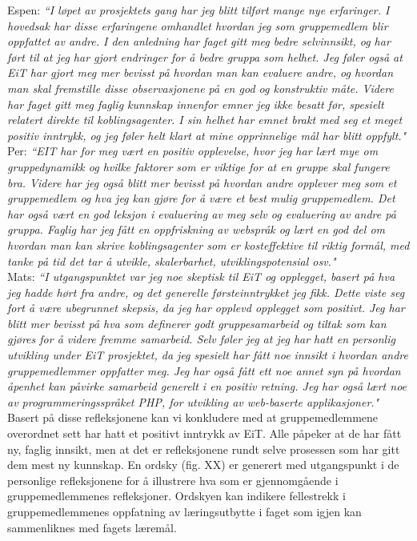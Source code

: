 Espen: \textit{``I løpet av prosjektets gang har jeg blitt tilført mange nye erfaringer. I hovedsak har disse erfaringene omhandlet hvordan jeg som gruppemedlem blir oppfattet av andre. I den anledning har faget gitt meg bedre selvinnsikt, og har ført til at jeg har gjort endringer for å bedre gruppa som helhet. Jeg føler også at EiT har gjort meg mer bevisst på hvordan man kan evaluere andre, og hvordan man skal fremstille disse observasjonene på en god og konstruktiv måte. Videre har faget gitt meg faglig kunnskap innenfor emner jeg ikke besatt før, spesielt relatert direkte til koblingsagenter. I sin helhet har emnet brakt med seg et meget positiv inntrykk, og jeg føler helt klart at mine opprinnelige mål har blitt oppfylt."}\\

Per: \textit{``EIT har for meg vært en positiv opplevelse, hvor jeg har lært mye om gruppedynamikk og hvilke faktorer som er viktige for at en gruppe skal fungere bra. Videre har jeg også blitt mer bevisst på hvordan andre opplever meg som et gruppemedlem og hva jeg kan gjøre for å være et best mulig gruppemedlem. Det har også vært en god leksjon i evaluering av meg selv og evaluering av andre på gruppa. Faglig har jeg fått en oppfriskning av webspråk og lært en god del om hvordan man kan skrive koblingsagenter som er kosteffektive til riktig formål, med tanke på tid det tar å utvikle, skalerbarhet, utviklingspotensial osv."}\\

Mats: \textit{``I utgangspunktet var jeg noe skeptisk til EiT og opplegget, basert på hva jeg hadde hørt fra andre, og det generelle førsteinntrykket jeg fikk. Dette viste seg fort å være ubegrunnet skepsis, da jeg har opplevd opplegget som positivt. Jeg har blitt mer bevisst på hva som definerer godt gruppesamarbeid og tiltak som kan gjøres for å videre fremme samarbeid.  Selv føler jeg at jeg har hatt en personlig utvikling under EiT prosjektet, da jeg spesielt har fått noe innsikt i hvordan andre gruppemedlemmer oppfatter meg. Jeg har også fått ett noe annet syn på hvordan åpenhet kan påvirke samarbeid generelt i en positiv retning. Jeg har også lært noe av programmeringsspråket PHP, for utvikling av web-baserte applikasjoner."}\\

Basert på disse refleksjonene kan vi konkludere med at gruppemedlemmene overordnet sett har hatt et positivt inntrykk av EiT. Alle påpeker at de har fått ny, faglig innsikt, men at det er refleksjonene rundt selve prosessen som har gitt dem mest ny kunnskap. En ordsky (fig. XX) er generert med utgangspunkt i de personlige refleksjonene for å illustrere hva som er gjennomgående i gruppemedlemmenes refleksjoner. Ordskyen kan indikere fellestrekk i gruppemedlemmenes oppfatning av læringsutbytte i faget som igjen kan sammenliknes med fagets læremål.\\

